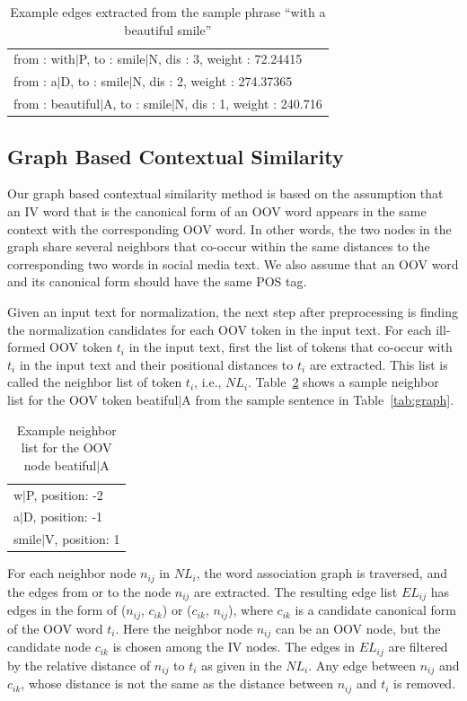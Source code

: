 \documentclass[preprint,review,12pt]{elsarticle}
\begin{document}
\begin{table}[hbt]
  \centering
  \begin{tabular}[tc]{l}
 from : with$|$P, to : smile$|$N, dis : 3, weight : 72.24415 \\
 from : a$|$D, to : smile$|$N, dis : 2, weight : 274.37365 \\
 from : beautiful$|$A, to : smile$|$N, dis : 1, weight : 240.716 \\
\end{tabular}
  \caption{Example edges extracted from the sample phrase  ``with a beautiful smile''}
\label{tab:edges}
\end{table}


\subsection{Graph Based Contextual Similarity}

Our graph based contextual similarity method is based on the assumption that an IV word that is the canonical form of an OOV word appears in the same context with the corresponding OOV word. In other words, the two nodes in the graph share several neighbors that co-occur within the same distances to the corresponding two words in social media text. We also assume that an OOV word and its canonical form should have the same POS tag.

Given an input text for normalization, the next step after preprocessing is finding the normalization candidates for each OOV token in the input text. For each ill-formed OOV token $t_i$ in the input text, first the list of tokens that co-occur with $t_i$ in the input text and their positional distances to $t_i$ are extracted.  This list is called the neighbor list of token $t_i$, i.e.,  $NL_i$. Table~\ref{tab:neigh} shows a sample neighbor list for the OOV token beatiful$|$A from the sample sentence in Table~\ref{tab:graph}.

\begin{table}[hbt]
  \centering
  \begin{tabular}[tc]{l}
    w$|$P, position: -2 \\
    a$|$D, position: -1 \\
    smile$|$V, position: 1 \\
  \end{tabular}
\caption{Example neighbor list for the OOV node beatiful$|$A}
\label{tab:neigh}
\end{table}

For each neighbor node $n_{ij}$ in $NL_i$, the word association graph is traversed, and the edges from or to the node $n_{ij}$ are extracted. The resulting edge list $EL_{ij}$ has edges in the form of ($n_{ij}$, $c_{ik}$) or ($c_{ik}$, $n_{ij}$), where $c_{ik}$ is a candidate canonical form of the OOV word $t_i$.
Here the neighbor node $n_{ij}$ can be an OOV node, but the candidate node $c_{ik}$ is chosen among the IV nodes.
The edges in $EL_{ij}$ are filtered by the relative distance of $n_{ij}$ to $t_i$ as given in the $NL_i$. Any edge between  $n_{ij}$ and $c_{ik}$, whose distance is not the same as the distance between $n_{ij}$ and $t_i$ is removed.
\end{document}
